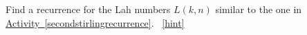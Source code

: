 \documentclass{book}
\begin{document}
\setcounter{project}{201}
\addtocounter{project}{-1}
\begin{activity}[]\label{activity-194}
\hypertarget{p-1132}{}%
Find a recurrence for the Lah numbers \(L(k,n)\) similar to the one in \hyperref[secondstirlingrecurrence]{Activity~\ref{secondstirlingrecurrence}}.%
~\hfill{\tiny\hyperlink{a-201}{[hint]}\hypertarget{q-201}{}}\end{activity}
\end{document}
